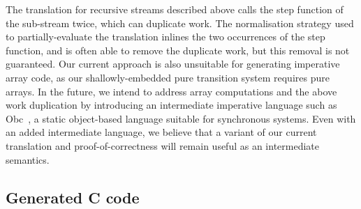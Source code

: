 The translation for recursive streams described above calls the step function of the sub-stream twice, which can duplicate work.
The normalisation strategy used to partially-evaluate the translation inlines the two occurrences of the step function, and is often able to remove the duplicate work, but this removal is not guaranteed.
Our current approach is also unsuitable for generating imperative array code, as our shallowly-embedded pure transition system requires pure arrays.
In the future, we intend to address array computations and the above work duplication by introducing an intermediate imperative language such as Obc~\cite{biernacki2008clock}, a static object-based language suitable for synchronous systems.
Even with an added intermediate language, we believe that a variant of our current translation and proof-of-correctness will remain useful as an intermediate semantics.

\subsection{Generated C code}
